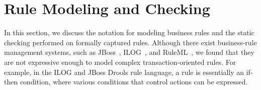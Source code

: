 
\newcommand{\term}{\textit}
\newcommand{\lit}{\texttt}

\section{Rule Modeling and Checking}
\label{sec:model}

In this section, we discuss the notation for modeling business rules and the
static checking performed on formally captured rules. Although there exist
business-rule management systems, such as JBoss~\cite{JBoss}, ILOG~\cite{ILog},
and RuleML~\cite{RuleML}, we found that they are not expressive enough to model
complex transaction-oriented rules. For example, in the ILOG and JBoss Drools
rule language, a rule is essentially an if-then condition, where various
conditions that control actions can be expressed.

